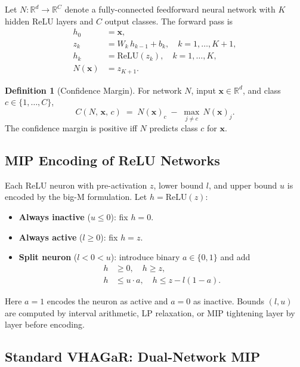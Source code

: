 \documentclass[11pt,a4paper]{article}
\theoremstyle{definition}
\newtheorem{definition}{Definition}[section]
\theoremstyle{plain}
\newcommand{\Conf}[3]{C(#1,\,#2,\,#3)}
\newcommand{\vx}{\mathbf{x}}
\begin{document}
Let $N : \mathbb{R}^d \to \mathbb{R}^C$ denote a fully-connected feedforward neural network with $K$ hidden ReLU layers and $C$ output classes. The forward pass is
\begin{align}
  h_0 &= \vx, \\
  z_k &= W_k\, h_{k-1} + b_k, \quad k = 1,\ldots,K+1, \\
  h_k &= \mathrm{ReLU}(z_k), \quad k = 1,\ldots,K, \\
  N(\vx) &= z_{K+1}.
\end{align}

\begin{definition}[Confidence Margin]
For network $N$, input $\vx \in \mathbb{R}^d$, and class $c \in \{1,\ldots,C\}$,
\[
  \Conf{N}{\vx}{c} \;=\; N(\vx)_c \;-\; \max_{j \ne c}\, N(\vx)_j.
\]
The confidence margin is positive iff $N$ predicts class $c$ for $\vx$.
\end{definition}

\subsection{MIP Encoding of ReLU Networks}
\label{sec:bigm}

Each ReLU neuron with pre-activation $z$, lower bound $l$, and upper bound $u$ is encoded by the big-M formulation. Let $h = \mathrm{ReLU}(z)$:
\begin{itemize}
  \item \textbf{Always inactive} ($u \le 0$): fix $h = 0$.
  \item \textbf{Always active} ($l \ge 0$): fix $h = z$.
  \item \textbf{Split neuron} ($l < 0 < u$): introduce binary $a \in \{0,1\}$ and add
    \begin{align}
      h &\ge 0, \quad h \ge z, \label{eq:bigm1} \\
      h &\le u \cdot a, \quad h \le z - l(1 - a). \label{eq:bigm2}
    \end{align}
\end{itemize}
Here $a=1$ encodes the neuron as active and $a=0$ as inactive. Bounds $(l,u)$ are computed by interval arithmetic, LP relaxation, or MIP tightening layer by layer before encoding.

\subsection{Standard VHAGaR: Dual-Network MIP}
\end{document}
